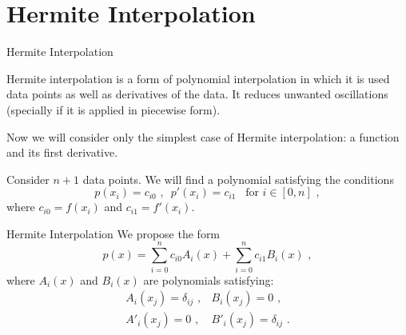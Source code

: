 \documentclass[11pt]{beamer}
\begin{document}
\section{Hermite Interpolation}
\begin{frame}[fragile]{Hermite Interpolation}

Hermite interpolation is a form of polynomial interpolation in which
it is used data points as well as derivatives of the data. It reduces unwanted
oscillations (specially  if it is applied in piecewise form). \\
\bigskip
\pause

Now we will consider only the simplest case of Hermite
interpolation:  a function and its first derivative.\\
\pause

Consider $n+1$ data points. We will find a polynomial 
satisfying the conditions
\begin{equation}
p(x_i) = c_{i0}\,\,,\,\,\,p'(x_i) = c_{i1}\,\,\,\, \,\text{for}\,\,i \in [0,n]\,\,,
\end{equation}
where $c_{i0} = f(x_i)$ and $c_{i1} = f'(x_i)$.
\end{frame}


\begin{frame}[fragile]{Hermite Interpolation}
We propose the form
\begin{equation}
p(x) = \sum_{i=0}^n c_{i0} A_i(x) + \sum_{i=0}^n c_{i1} B_i(x)\,\,,
\end{equation}
where $A_i(x)$ and $B_i(x)$ are polynomials satisfying:
\renewcommand\arraystretch{1.2}%
\begin{equation}
\begin{array}{ll}
A_i(x_j) = \delta_{ij}\,\,,  &B_i(x_j) = 0\,\,,\\
A'_i(x_j) = 0\,\,, &B'_i(x_j) = \delta_{ij}\,\,.
\end{array}
\end{equation}
\renewcommand\arraystretch{1.0}%
\end{frame}
\end{document}

